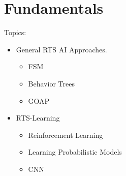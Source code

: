 
\chapter{Fundamentals}
\label{ch:Fundamentals}

Topics:
\begin{itemize}[noitemsep,nolistsep]
	\item General RTS AI Approaches.
	\begin{itemize}[noitemsep,nolistsep]
		\item FSM
		\item Behavior Trees
		\item GOAP
	\end{itemize}
	\item RTS-Learning
	\begin{itemize}[noitemsep,nolistsep]
		\item Reinforcement Learning
		\item Learning Probabilistic Models
		\item CNN
	\end{itemize}
\end{itemize}
